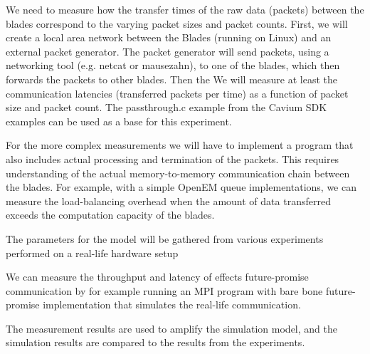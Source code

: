 We need to measure how the transfer times of the raw data (packets) between the blades correspond to the varying packet sizes and packet counts. First, we will create a local area network between the Blades (running on Linux) and an external packet generator. The packet generator will send packets, using a networking tool (e.g. netcat or mausezahn), to one of the blades, which then forwards the packets to other blades. Then the We will measure at least the communication latencies (transferred packets per time) as a function of packet size and packet count. The passthrough.c example from the Cavium SDK examples can be used as a base for this experiment.

For the more complex measurements we will have to implement a program that also includes actual processing and termination of the packets. This requires understanding of the actual memory-to-memory communication chain between the blades. For example, with a simple OpenEM queue implementations, we can measure the load-balancing overhead when the amount of data transferred exceeds the computation capacity of the blades.



The parameters for the model will be gathered from various experiments performed on a real-life hardware setup

We can measure the throughput and latency of effects future-promise communication by for example running an MPI program with bare bone future-promise implementation that simulates the real-life communication.

The measurement results are used to amplify the simulation model, and the simulation results are compared to the results from the experiments.

